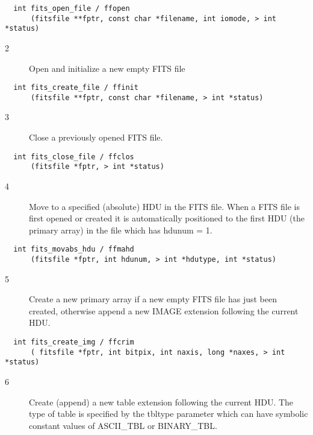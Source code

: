 \begin{verbatim}
  int fits_open_file / ffopen
      (fitsfile **fptr, const char *filename, int iomode, > int *status)
\end{verbatim}

\begin{description}
\item[2 ] Open and initialize a new empty FITS file
\end{description}

\begin{verbatim}
  int fits_create_file / ffinit
      (fitsfile **fptr, const char *filename, > int *status)
\end{verbatim}

\begin{description}
\item[3 ]Close a previously opened FITS file.
\end{description}

\begin{verbatim}
  int fits_close_file / ffclos
      (fitsfile *fptr, > int *status)
\end{verbatim}

\begin{description}
\item[4 ] Move to a specified (absolute) HDU in the FITS file.  When a FITS file
    is first opened or created it is automatically positioned to the first
   HDU (the primary array) in the file which has hdunum = 1.
\end{description}

\begin{verbatim}
  int fits_movabs_hdu / ffmahd
      (fitsfile *fptr, int hdunum, > int *hdutype, int *status)
\end{verbatim}

\begin{description}
\item[5 ]Create a new primary array if a new empty FITS file has just been
  created, otherwise append a new IMAGE extension following the current HDU.
\end{description}

\begin{verbatim}
  int fits_create_img / ffcrim
      ( fitsfile *fptr, int bitpix, int naxis, long *naxes, > int *status)
\end{verbatim}

\begin{description}
\item[6 ]Create (append) a new table extension following the current HDU.
   The type of table is specified by the tbltype parameter which can have
  symbolic constant values of ASCII\_TBL or BINARY\_TBL.
\end{description}

